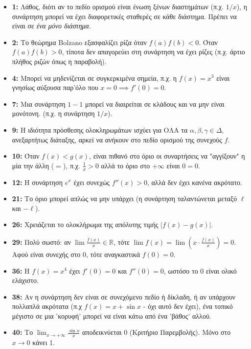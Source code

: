 \documentclass[a4paper,11pt,twoside]{article}
\begin{document}
\begin{itemize}
    \item \textbf{1:} Λάθος, διότι αν το πεδίο ορισμού είναι ένωση ξένων διαστημάτων (π.χ. $1/x$), η συνάρτηση μπορεί να έχει διαφορετικές σταθερές σε κάθε διάστημα. Πρέπει να είναι σε \textit{ένα μόνο διάστημα}.
    \item \textbf{2:} Το θεώρημα Bolzano εξασφαλίζει ρίζα όταν $f(a)f(b)<0$.  Όταν $f(a)f(b)>0$, τίποτα δεν απαγορεύει στη συνάρτηση να έχει ρίζες (π.χ. άρτιο πλήθος ριζών όπως η παραβολή).
    \item \textbf{4:} Μπορεί να μηδενίζεται σε συγκερκιμένα σημεία, π.χ. η $f(x)=x^3$ είναι γνησίως αύξουσα παρ'όλο που $x=0 \implies f'(0)=0$.
    \item \textbf{7:} Μια συνάρτηση $1-1$ μπορεί να διαιρείται σε κλάδους και να μην είναι μονότονη. (π.χ. η συνάρτηση $1/x$).
    \item \textbf{9:} Η ιδιότητα πρόσθεσης ολοκληρωμάτων ισχύει για ΟΛΑ τα $\alpha, \beta, \gamma \in \Delta$, ανεξαρτήτως διάταξης, αρκεί να ανήκουν στο πεδίο ορισμού της συνεχούς $f$. 
    \item \textbf{10:} Όταν $f(x) < g(x)$, είναι πιθανό στο όριο οι συναρτήσεις να "αγγίξουν" η μία την άλλη ($=$), π.χ. $\frac{1}{x} > 0$ αλλά το όριο στο $+\infty$ είναι $0=0$.
    \item \textbf{12:} Η συνάρτηση $e^x$ έχει συνεχώς $f''(x)>0$, αλλά δεν έχει κανένα ακρότατο.
    \item \textbf{21:} Το όριο μπορεί απλώς να μην υπάρχει (η συνάρτηση ταλαντώνεται μεταξύ $\ell$ και $-\ell$).
    \item \textbf{26:} Χρειάζεται το ολοκλήρωμα της απόλυτης τιμής $|f(x)-g(x)|$.
    \item \textbf{29:} Πολύ σωστό: αν $\lim \frac{f(x)}{x} \in \mathbb{R}$, τότε $\lim f(x) = \lim (x \cdot \frac{f(x)}{x}) = 0$. Αφού είναι συνεχής στο 0, τότε αναγκαστικά $f(0)=0$.
    \item \textbf{36:} Η $f(x)=x^4$ έχει $f'(0)=0$ και $f''(0)=0$, ωστόσο το $0$ είναι ολικό ελάχιστο.
    \item \textbf{38:} Αν η συνάρτηση δεν είναι σε συνεχόμενο πεδίο ή δίκλαδη, ή αν υπάρχουν πολλαπλά ακρότατα (π.χ $f(x) = x + \sin x$ - όχι αυτό δεν έχει), ένα τοπικό μέγιστο σε μια 'κορυφή' μπορεί να είναι κάτω από ένα 'βάθος' αλλού. 
    \item \textbf{40:} Το $\lim_{x\to +\infty} \frac{\sin x}{x}$ αποδεικνύεται 0 (Κριτήριο Παρεμβολής). Μόνο στο $x \to 0$ κάνει 1.
\end{itemize}
\end{document}
